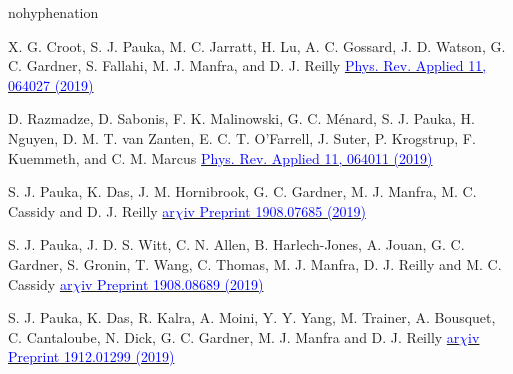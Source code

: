 \begin{hyphenrules}{nohyphenation}
\begin{sloppypar}
      {X. G. Croot, S. J. Pauka, M. C. Jarratt, H. Lu, A. C. Gossard, J. D. Watson, G. C. Gardner, S. Fallahi, M. J. Manfra, and D. J. Reilly}
      {\href{https://doi.org/\detokenize{10.1103/PhysRevApplied.11.064027}}{\textcolor{blue}{Phys. Rev. Applied 11, 064027 (2019)}}}

      {D. Razmadze, D. Sabonis, F. K. Malinowski, G. C. Ménard, S. J. Pauka, H. Nguyen, D. M. T. van Zanten, E. C. T. O'Farrell, J. Suter, P. Krogstrup, F. Kuemmeth, and C. M. Marcus}
      {\href{https://doi.org/\detokenize{10.1103/PhysRevApplied.11.064011}}{\textcolor{blue}{Phys. Rev. Applied 11, 064011 (2019)}}}

      {S. J. Pauka, K. Das, J. M. Hornibrook, G. C. Gardner, M. J. Manfra, M. C. Cassidy and D. J. Reilly}
      {\href{https://arxiv.org/abs/1908.07685}{\textcolor{blue}{ar$χ$iv Preprint 1908.07685 (2019)}}}

      {S. J. Pauka, J. D. S. Witt, C. N. Allen, B. Harlech-Jones, A. Jouan, G. C. Gardner, S. Gronin, T. Wang, C. Thomas, M. J. Manfra, D. J. Reilly and M. C. Cassidy}
      {\href{https://arxiv.org/abs/1908.08689}{\textcolor{blue}{ar$χ$iv Preprint 1908.08689 (2019)}}}

      {S. J. Pauka, K. Das, R. Kalra, A. Moini, Y. Y. Yang, M. Trainer, A. Bousquet, C. Cantaloube, N. Dick, G. C. Gardner, M. J. Manfra and D. J. Reilly}
      {\href{https://arxiv.org/abs/1912.01299}{\textcolor{blue}{ar$χ$iv Preprint 1912.01299 (2019)}}}



\end{sloppypar}
\end{hyphenrules}
